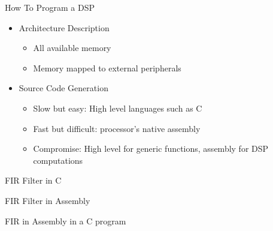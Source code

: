 \documentclass{beamer}
\begin{document}
\begin{frame}{How To Program a DSP}
    \begin{itemize}
        \item Architecture Description
            \begin{itemize}
                \item All available memory
                \item Memory mapped to external peripherals
            \end{itemize}
        \item Source Code Generation
            \begin{itemize}
                \item Slow but easy: High level languages such as C
                \item Fast but difficult: processor's native assembly
                \item Compromise: High level for generic functions, assembly for DSP computations
            \end{itemize}
    \end{itemize}
\end{frame}

\begin{frame}{FIR Filter in C}
\end{frame}

\begin{frame}{FIR Filter in Assembly}
\end{frame}

\begin{frame}{FIR in Assembly in a C program}
\end{frame}
\end{document}
